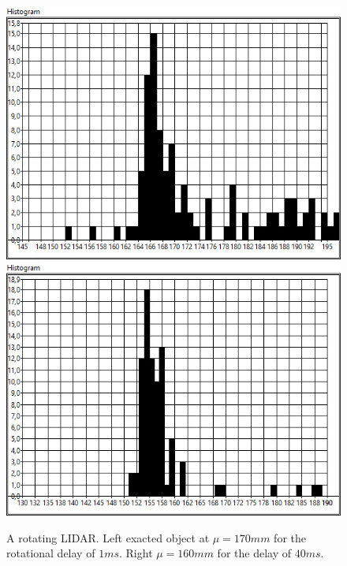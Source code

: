 \begin{figure}[ht]
    \centering
        \includegraphics[scale=0.2] {./mesurment/data/Expected_170,0__Mean_176,02__Distrubution_13,567648_Rotating_1ms}
        \includegraphics[scale=0.2] {./mesurment/data/Expected_160,0__Mean_156,97__Distrubution_6,850402_Rotating_40ms}
  \caption{A rotating LIDAR. Left exacted object at $ \mu=170mm $  for the rotational delay of $1ms$. Right $ \mu=160mm$ for the delay of $40ms$.}
  \label{fig:test-hist}
\end{figure}

